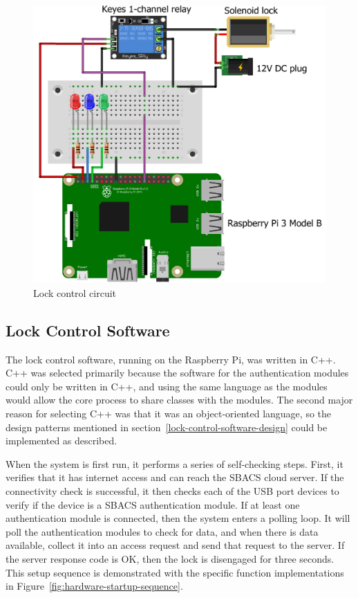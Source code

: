 \documentclass[12pt]{report}
\let\Oldsubsection\subsection
\renewcommand{\subsection}{\FloatBarrier\Oldsubsection}
\begin{document}
\begin{figure}
    \includegraphics[width=\textwidth]{Diagrams/Hardware-Diagrams/hardware_lock_control}
    \caption{Lock control circuit}
    \label{fig:lock-control-circuit-diagram}
\end{figure}

\subsection{Lock Control Software} \label{lock-control-software}

The lock control software, running on the Raspberry Pi, was written in C++. C++ was selected primarily because the 
software for the authentication modules could only be written in C++, and using the same language as the modules would 
allow the core process to share classes with the modules. The second major reason for selecting C++ was that it was an 
object-oriented language, so the design patterns mentioned in section~\ref{lock-control-software-design} could be 
implemented as described.

When the system is first run, it performs a series of self-checking steps. First, it verifies that it has internet 
access and can reach the SBACS cloud server. If the connectivity check is successful, it then checks each of the USB 
port devices to verify if the device is a SBACS authentication module. If at least one authentication module is 
connected, then the system enters a polling loop. It will poll the authentication modules to check for data, and when 
there is data available, collect it into an access request and send that request to the server. If the server response 
code is OK, then the lock is disengaged for three seconds. This setup sequence is demonstrated with the specific 
function implementations in Figure~\ref{fig:hardware-startup-sequence}.
\end{document}
